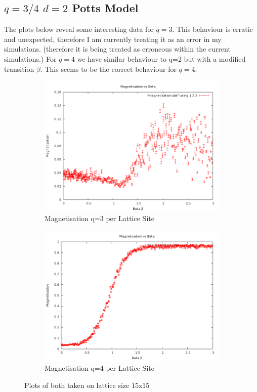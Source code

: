 \documentclass[10pt,a4paper]{article}
\begin{document}
\subsection{$q=3/4$ $d=2$ Potts Model}
The plots below reveal some interesting data for $q=3$. 
This behaviour is erratic and unexpected, therefore I am currently treating it as an error in my simulations. (therefore it is being treated as erroneous within the current simulations.) 
For $q=4$ we have similar behaviour to q=2 but with a modified transition $\beta$.
This seems to be the correct behaviour for $q=4$.
\begin{figure}[H]
\centering
	\begin{subfigure}[b]{0.4\textwidth}
		\includegraphics[width=\textwidth]{q=3magnetisationvsbeta.png}	
		\caption{Magnetisation q=3 per Lattice Site}
	\end{subfigure}
	\begin{subfigure}[b]{0.4\textwidth}
		\includegraphics[width=\textwidth]{q=4magnetisationvsbeta.png}
		\caption{Magnetisation q=4 per Lattice Site}
	\end{subfigure}
\caption{Plots of both taken on lattice size $15 \textrm{x} 15$}
\end{figure}
\end{document}
